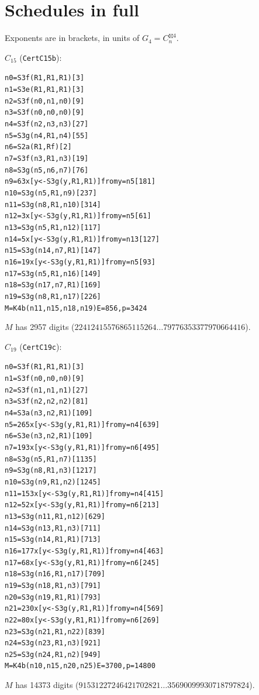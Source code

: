 \documentclass[11pt]{amsart}
\newcommand{\sbx}{\boxtimes}
\newcommand{\code}[1]{\texttt{#1}}
\begin{document}
\appendix
\section{Schedules in full}\label{app}
Exponents are in brackets, in units of $G_4=C_n^{\sbx4}$.

\noindent\textbf{$C_{15}$} (\code{CertC15b}):
\begin{alltt}\footnotesize
n0  = S3f(R1, R1, R1)                          [3]
n1  = S3e(R1, R1, R1)                          [3]
n2  = S3f(n0, n1, n0)                          [9]
n3  = S3f(n0, n0, n0)                          [9]
n4  = S3f(n2, n3, n3)                          [27]
n5  = S3g(n4, R1, n4)                          [55]
n6  = S2a(R1, Rf)                              [2]
n7  = S3f(n3, R1, n3)                          [19]
n8  = S3g(n5, n6, n7)                          [76]
n9  = 63 x [y <- S3g(y, R1, R1)] from y = n5   [181]
n10 = S3g(n5, R1, n9)                          [237]
n11 = S3g(n8, R1, n10)                         [314]
n12 = 3 x [y <- S3g(y, R1, R1)] from y = n5    [61]
n13 = S3g(n5, R1, n12)                         [117]
n14 = 5 x [y <- S3g(y, R1, R1)] from y = n13   [127]
n15 = S3g(n14, n7, R1)                         [147]
n16 = 19 x [y <- S3g(y, R1, R1)] from y = n5   [93]
n17 = S3g(n5, R1, n16)                         [149]
n18 = S3g(n17, n7, R1)                         [169]
n19 = S3g(n8, R1, n17)                         [226]
M   = K4b(n11, n15, n18, n19)                  E = 856, p = 3424
\end{alltt}
$M$ has 2957 digits ($22412415576865115264\ldots79776353377970664416$).

\noindent\textbf{$C_{19}$} (\code{CertC19c}):
\begin{alltt}\footnotesize
n0  = S3f(R1, R1, R1)                          [3]
n1  = S3f(n0, n0, n0)                          [9]
n2  = S3f(n1, n1, n1)                          [27]
n3  = S3f(n2, n2, n2)                          [81]
n4  = S3a(n3, n2, R1)                          [109]
n5  = 265 x [y <- S3g(y, R1, R1)] from y = n4  [639]
n6  = S3e(n3, n2, R1)                          [109]
n7  = 193 x [y <- S3g(y, R1, R1)] from y = n6  [495]
n8  = S3g(n5, R1, n7)                          [1135]
n9  = S3g(n8, R1, n3)                          [1217]
n10 = S3g(n9, R1, n2)                          [1245]
n11 = 153 x [y <- S3g(y, R1, R1)] from y = n4  [415]
n12 = 52 x [y <- S3g(y, R1, R1)] from y = n6   [213]
n13 = S3g(n11, R1, n12)                        [629]
n14 = S3g(n13, R1, n3)                         [711]
n15 = S3g(n14, R1, R1)                         [713]
n16 = 177 x [y <- S3g(y, R1, R1)] from y = n4  [463]
n17 = 68 x [y <- S3g(y, R1, R1)] from y = n6   [245]
n18 = S3g(n16, R1, n17)                        [709]
n19 = S3g(n18, R1, n3)                         [791]
n20 = S3g(n19, R1, R1)                         [793]
n21 = 230 x [y <- S3g(y, R1, R1)] from y = n4  [569]
n22 = 80 x [y <- S3g(y, R1, R1)] from y = n6   [269]
n23 = S3g(n21, R1, n22)                        [839]
n24 = S3g(n23, R1, n3)                         [921]
n25 = S3g(n24, R1, n2)                         [949]
M   = K4b(n10, n15, n20, n25)                  E = 3700, p = 14800
\end{alltt}
$M$ has 14373 digits ($91531227246421702821\ldots35690099930718797824$).
\end{document}
